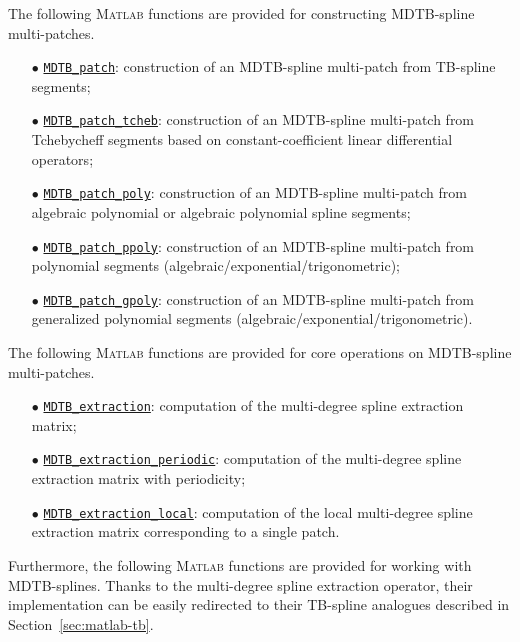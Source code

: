 \documentclass[10pt]{acmtrans2e}
\newcommand{\Matlab}{\textsc{Matlab}}
\begin{document}
The following \Matlab{} functions are provided for constructing MDTB-spline multi-patches.
\begin{itemize}
  \item[$\bullet$] \hyperref[sec:matlab-mdtb-patch]{\texttt{MDTB\_patch}}: 
    construction of an MDTB-spline multi-patch from TB-spline segments;
  \item[$\bullet$] \hyperref[sec:matlab-mdtb-patch-tcheb]{\texttt{MDTB\_patch\_tcheb}}: 
    construction of an MDTB-spline multi-patch from Tchebycheff segments based on constant-coefficient linear differential operators; 
  \item[$\bullet$] \hyperref[sec:matlab-mdtb-patch-poly]{\texttt{MDTB\_patch\_poly}}: 
    construction of an MDTB-spline multi-patch from algebraic polynomial or algebraic polynomial spline segments; 
  \item[$\bullet$] \hyperref[sec:matlab-mdtb-patch-ppoly]{\texttt{MDTB\_patch\_ppoly}}: 
    construction of an MDTB-spline multi-patch from polynomial segments (algebraic/exponential/trigonometric); 
  \item[$\bullet$] \hyperref[sec:matlab-mdtb-patch-gpoly]{\texttt{MDTB\_patch\_gpoly}}: 
    construction of an MDTB-spline multi-patch from generalized polynomial segments (algebraic/exponential/trigonometric).
\end{itemize}
The following \Matlab{} functions are provided for core operations on MDTB-spline multi-patches.
\begin{itemize}
  \item[$\bullet$] \hyperref[sec:matlab-mdtb-extraction]{\texttt{MDTB\_extraction}}: 
    computation of the multi-degree spline extraction matrix;
  \item[$\bullet$] \hyperref[sec:matlab-mdtb-extraction-periodic]{\texttt{MDTB\_extraction\_periodic}}: 
    computation of the multi-degree spline extraction matrix with periodicity;
  \item[$\bullet$] \hyperref[sec:matlab-mdtb-extraction-local]{\texttt{MDTB\_extraction\_local}}: 
    computation of the local multi-degree spline extraction matrix corresponding to a single patch.
\end{itemize}
Furthermore, the following \Matlab{} functions are provided for working with MDTB-splines. Thanks to the multi-degree spline extraction operator, their implementation can be easily redirected to their TB-spline analogues described in Section~\ref{sec:matlab-tb}.
\end{document}
